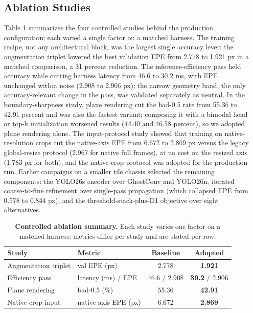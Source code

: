 \documentclass[conference]{IEEEtran}
\begin{document}
\subsection{Ablation Studies}
Table \ref{tab:ablations} summarizes the four controlled studies behind the production configuration; each varied a single factor on a matched harness. The training recipe, not any architectural block, was the largest single accuracy lever: the augmentation triplet lowered the best validation EPE from 2.778 to 1.921 px in a matched comparison, a 31 percent reduction. The inference-efficiency pass held accuracy while cutting harness latency from 46.6 to 30.2 ms, with EPE unchanged within noise (2.908 to 2.906 px); the narrow geometry band, the only accuracy-relevant change in the pass, was validated separately as neutral. In the boundary-sharpness study, plane rendering cut the bad-0.5 rate from 55.36 to 42.91 percent and was also the fastest variant; composing it with a bimodal head or top-k initialization worsened results (44.40 and 46.58 percent), so we adopted plane rendering alone. The input-protocol study showed that training on native-resolution crops cut the native-axis EPE from 6.672 to 2.869 px versus the legacy global-resize protocol (2.967 for native full frames), at no cost on the resized axis (1.783 px for both), and the native-crop protocol was adopted for the production run. Earlier campaigns on a smaller tile chassis selected the remaining components: the YOLO26s encoder over GhostConv and YOLO26n, iterated coarse-to-fine refinement over single-pass propagation (which collapsed EPE from 0.578 to 0.844 px), and the threshold-stack-plus-D1 objective over eight alternatives.

\begin{table}[!htbp]
\centering
\caption{\textbf{Controlled ablation summary.} Each study varies one factor on a matched harness; metrics differ per study and are stated per row.}
\label{tab:ablations}
\footnotesize
\setlength{\tabcolsep}{4pt}
\begin{tabular}{llcc}
\toprule
Study & Metric & Baseline & Adopted\\
\midrule
Augmentation triplet & val EPE (px) & 2.778 & \textbf{1.921}\\
Efficiency pass & latency (ms) / EPE & 46.6 / 2.908 & \textbf{30.2} / 2.906\\
Plane rendering & bad-0.5 (\%) & 55.36 & \textbf{42.91}\\
Native-crop input & native-axis EPE (px) & 6.672 & \textbf{2.869}\\
\bottomrule
\end{tabular}
\end{table}
\end{document}
